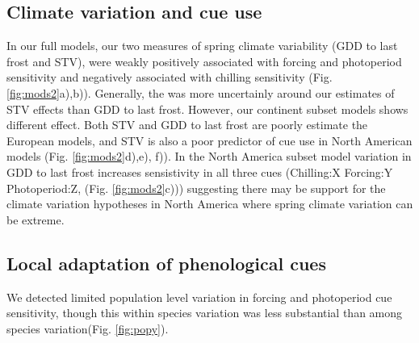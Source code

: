 \documentclass[12pt]{article}\usepackage[]{graphicx}\usepackage[]{color}
\begin{document}
\subsection*{Climate variation and cue use}
In our full models, our two measures of spring climate variability (GDD to last frost and STV), were weakly positively associated with forcing and photoperiod sensitivity and negatively associated with chilling sensitivity (Fig. \ref{fig:mods2}a),b)). Generally, the was more uncertainly around our estimates of STV effects than GDD to last frost. However, our continent subset models shows different effect. Both STV and GDD to last frost are poorly estimate the European models, and STV is also a poor predictor of cue use in North American models (Fig. \ref{fig:mods2}d),e), f)). In the North America subset model variation in GDD to last frost increases sensistivity in all three cues (Chilling:X Forcing:Y Photoperiod:Z, (Fig. \ref{fig:mods2}c))) suggesting there may be support for the climate variation hypotheses in North America where spring climate variation can be extreme.

\subsection*{Local adaptation of phenological cues}
We detected limited population level variation in forcing and photoperiod cue sensitivity, though this within species variation was less substantial than among species variation(Fig. \ref{fig:popy}). 
\end{document}
